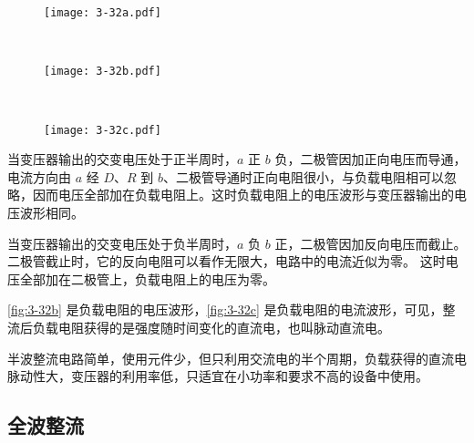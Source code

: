 \begin{figure}
  \begin{minipage}{0.1\linewidth}
    \subcaption{}\label{fig:3-32a}
  \end{minipage}%
  \begin{minipage}{0.6\linewidth}
    \texttt{[image: 3-32a.pdf]}
  \end{minipage}\\[-3mm]
  \begin{minipage}{0.1\linewidth}
    \subcaption{}\label{fig:3-32b}
  \end{minipage}%
  \begin{minipage}{0.6\linewidth}
    \texttt{[image: 3-32b.pdf]}
  \end{minipage}\\[-3mm]
  \begin{minipage}{0.1\linewidth}
    \subcaption{}\label{fig:3-32c}
  \end{minipage}%
  \begin{minipage}{0.6\linewidth}
    \texttt{[image: 3-32c.pdf]}
  \end{minipage}
  \caption{}\label{fig:3-32}
\end{figure}

当变压器输出的交变电压处于正半周时，$a$ 正 $b$ 负，二极管因加正向电压而导通，电流方向由 $a$ 经 $D$、$R$ 到 $b$、二极管导通时正向电阻很小，与负载电阻相可以忽略，因而电压全部加在负载电阻上。这时负载电阻上的电压波形与变压器输出的电压波形相同。

当变压器输出的交变电压处于负半周时，$a$ 负 $b$ 正，二极管因加反向电压而截止。
二极管截止时，它的反向电阻可以看作无限大，电路中的电流近似为零。
这时电压全部加在二极管上，负载电阻上的电压为零。

\cref{fig:3-32b} 是负载电阻的电压波形，\cref{fig:3-32c} 是负载电阻的电流波形，可见，整流后负载电阻获得的是强度随时间变化的直流电，也叫脉动直流电。

半波整流电路简单，使用元件少，但只利用交流电的半个周期，负载获得的直流电脉动性大，变压器的利用率低，只适宜在小功率和要求不高的设备中使用。

\subsection{全波整流}

